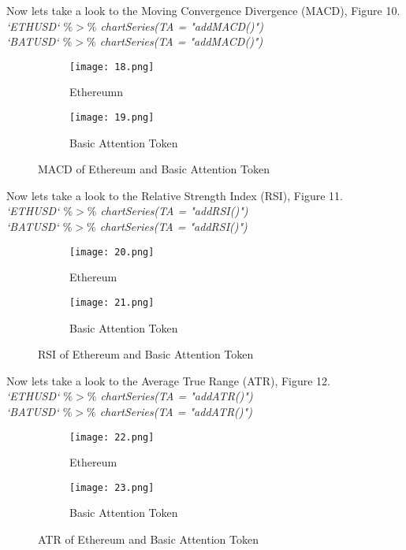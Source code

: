 \documentclass[14pt]{amsart}
\begin{document}
Now lets take a look to the Moving Convergence Divergence (MACD), Figure 10.\\

\noindent \textit{`ETHUSD` $\%>\%$ chartSeries(TA = "addMACD()")}\\
\noindent \textit{`BATUSD` $\%>\%$ chartSeries(TA = "addMACD()")}

\begin{figure}[h!]
  \centering
  \begin{subfigure}[b]{0.4\linewidth}
    \texttt{[image: 18.png]}
    \caption{Ethereumn}
  \end{subfigure}
  \begin{subfigure}[b]{0.4\linewidth}
    \texttt{[image: 19.png]}
    \caption{Basic Attention Token}
  \end{subfigure}
  \caption{MACD of Ethereum and Basic Attention Token}
  \label{fig:coffee}
\end{figure}

Now lets take a look to the Relative Strength Index (RSI), Figure 11.\\

\noindent \textit{`ETHUSD` $\%>\%$ chartSeries(TA = "addRSI()")}\\
\noindent \textit{`BATUSD` $\%>\%$ chartSeries(TA = "addRSI()")}

\begin{figure}[h!]
  \centering
  \begin{subfigure}[b]{0.4\linewidth}
    \texttt{[image: 20.png]}
    \caption{Ethereum}
  \end{subfigure}
  \begin{subfigure}[b]{0.4\linewidth}
    \texttt{[image: 21.png]}
    \caption{Basic Attention Token}
  \end{subfigure}
  \caption{RSI of Ethereum and Basic Attention Token}
  \label{fig:coffee}
\end{figure}

Now lets take a look to the Average True Range (ATR), Figure 12.\\

\noindent \textit{`ETHUSD` $\%>\%$ chartSeries(TA = "addATR()")}\\
\noindent \textit{`BATUSD` $\%>\%$ chartSeries(TA = "addATR()")}\\

\begin{figure}[h!]
  \centering
  \begin{subfigure}[b]{0.4\linewidth}
    \texttt{[image: 22.png]}
    \caption{Ethereum}
  \end{subfigure}
  \begin{subfigure}[b]{0.4\linewidth}
    \texttt{[image: 23.png]}
    \caption{Basic Attention Token}
  \end{subfigure}
  \caption{ATR of Ethereum and Basic Attention Token}
  \label{fig:coffee}
\end{figure}
\end{document}
